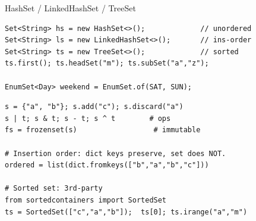 \documentclass[10pt]{article}
\begin{document}
\begin{construct}{HashSet / LinkedHashSet / TreeSet}
\noindent
\begin{minipage}[t]{0.485\linewidth}
\begin{lstlisting}[style=java, title=Java]
Set<String> hs = new HashSet<>();             // unordered
Set<String> ls = new LinkedHashSet<>();       // ins-order
Set<String> ts = new TreeSet<>();             // sorted
ts.first(); ts.headSet("m"); ts.subSet("a","z");

EnumSet<Day> weekend = EnumSet.of(SAT, SUN);
\end{lstlisting}
\end{minipage}\hfill
\begin{minipage}[t]{0.485\linewidth}
\begin{lstlisting}[style=python, title=Python]
s = {"a", "b"}; s.add("c"); s.discard("a")
s | t; s & t; s - t; s ^ t        # ops
fs = frozenset(s)                  # immutable

# Insertion order: dict keys preserve, set does NOT.
ordered = list(dict.fromkeys(["b","a","b","c"]))

# Sorted set: 3rd-party
from sortedcontainers import SortedSet
ts = SortedSet(["c","a","b"]);  ts[0]; ts.irange("a","m")
\end{lstlisting}
\end{minipage}
\end{construct}

\end{document}
